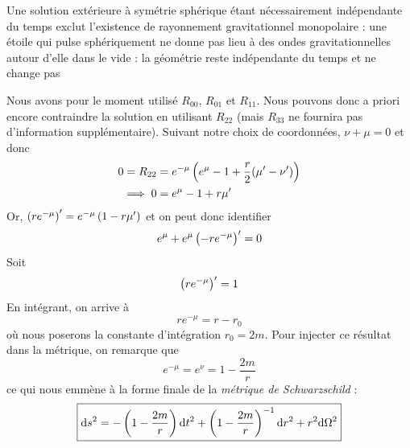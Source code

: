 \begin{rmk}
    Une solution extérieure à symétrie sphérique étant nécessairement indépendante du temps exclut l'existence de rayonnement gravitationnel monopolaire : une étoile qui pulse sphériquement ne donne pas lieu à des ondes gravitationnelles autour d'elle dans le vide : la géométrie reste indépendante du temps et ne change pas
\end{rmk}
Nous avons pour le moment utilisé $R_{00}$, $R_{01}$ et $R_{11}$. Nous pouvons donc a priori encore contraindre la solution en utilisant $R_{22}$ (mais $R_{33}$ ne fournira pas d'information supplémentaire). Suivant notre choix de coordonnées, $\nu + \mu = 0$ et donc
\begin{align}
    0 = R_{22} &= e^{-\mu} \left( e^\mu - 1 + \frac{r}{2} (\mu' - \nu')\right) \\
    \implies 0 & =  e^\mu -1 + r \mu'
\end{align}
Or, $\left( r e^{-\mu}\right)' = e^{-\mu} \left( 1 - r \mu'\right)$ et on peut donc identifier
\begin{equation}
    e^\mu + e^\mu \left( -r e^{-\mu} \right)' = 0
\end{equation}
Soit
\begin{equation}
    \left( r e^{-\mu} \right)' = 1
\end{equation}
En intégrant, on arrive à 
\begin{equation}
    r e^{-\mu} = r - r_0
\end{equation}
où nous poserons la constante d'intégration $r_0 = 2 m$. Pour injecter ce résultat dans la métrique, on remarque que
\begin{equation}
    e^{-\mu} = e^\nu = 1 - \frac{2m}{r}
\end{equation}
ce qui nous emmène à la forme finale de la \emph{métrique de Schwarzschild} :
\begin{align}
    \label{métrique de Schwarzschild}
    \boxed{\mathrm{d} s^2 = - \left( 1 - \frac{2m}{r} \right) \mathrm{d} t^2 + \left( 1 - \frac{2m}{r} \right)^{-1} \mathrm{d} r^2 + r^2 \mathrm{d} \Omega^2}
\end{align}
